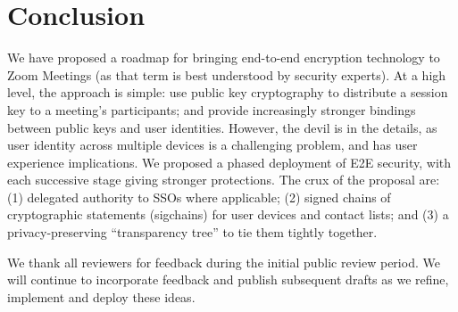 \section{Conclusion}

We have proposed a roadmap for bringing end-to-end encryption technology to Zoom Meetings (as that term is best understood by security experts). At a high level, the approach is simple: use public key cryptography to distribute a session key to a meeting's participants; and provide increasingly stronger bindings between public keys and user identities. However, the devil is in the details, as user identity across multiple devices is a challenging problem, and has user experience implications. We proposed a phased deployment of E2E security, with each successive stage giving stronger protections. The crux of the proposal are: (1) delegated authority to SSOs where applicable; (2) signed chains of cryptographic statements (sigchains) for user devices and contact lists; and (3) a privacy-preserving ``transparency tree'' to tie them tightly together.

We thank all reviewers for feedback during the initial public review period.
%
We will continue to incorporate feedback and publish subsequent drafts as we refine, implement and deploy these ideas.
